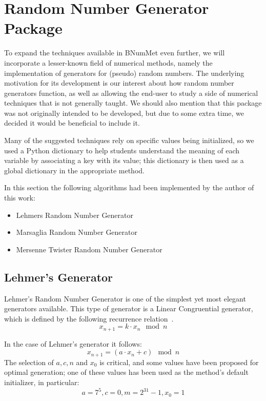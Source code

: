 \section{Random Number Generator Package}
To expand the techniques available in BNumMet even further, we will incorporate a lesser-known field of numerical methods, namely the implementation of generators for (pseudo) random numbers. The underlying motivation for its development is our interest about how random number generators function, as well as allowing the end-user to study a side of numerical techniques that is not generally taught. We should also mention that this package was not originally intended to be developed, but due to some extra time, we decided it would be beneficial to include it.

Many of the suggested techniques rely on specific values being initialized, so we used a Python dictionary to help students understand the meaning of each variable by associating a key with its value; this dictionary is then used as a global dictionary in the appropriate method.

In this section the following algorithms had been implemented by the author of this work:
\begin{itemize}
    \item Lehmers Random Number Generator 
    \item Marsaglia Random Number Generator 
    \item Mersenne Twister Random Number Generator 
\end{itemize}

\subsection{Lehmer's Generator}
Lehmer's Random Number Generator is one of the simplest yet most elegant generators available. This type of generator is a Linear Congruential generator, which is defined by the following recurrence relation~\cite{payne1969coding,park1988random}.
\[x_{n+1} = k\cdot x_n \mod{n}\]

In the case of Lehmer's generator it follows:
\[x_{n+1} = (a\cdot x_n+c) \mod{n}\]
The selection of $a,c,n$ and $x_0$ is critical, and some values have been proposed for optimal generation; one of these values has been used as the method's default initializer, in particular:
\[a= 7^5, c=0, m=2^{31}-1, x_0 = 1 \]

